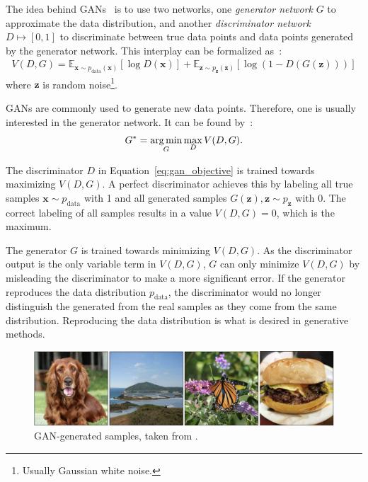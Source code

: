 The idea behind \acp{GAN}~\citep{goodfellow2014gans} is to use two networks, one \textit{generator network} $G$ to approximate the data distribution, and another \textit{discriminator network} $D \mapsto [0, 1]$ to discriminate between true data points and data points generated by the generator network.
This interplay can be formalized as~\citep{goodfellow2014gans}:
\begin{align}
    V(D, G)=\mathbb{E}_{\bm{x} \sim p_{\text{data}}(\bm{x})}[\log D(\bm{x})]+\mathbb{E}_{\bm{z} \sim p_{\bm{z}}(\bm{z})}[\log (1-D(G(\bm{z})))]
\end{align}
where $\bm{z}$ is random noise\footnote{Usually Gaussian white noise.}.

\acp{GAN} are commonly used to generate new data points.
Therefore, one is usually interested in the generator network.
It can be found by~\citep{goodfellow2014gans}:
\begin{align}
    G^* = \operatorname*{arg\,min}_G \max_{D} V(D, G). \label{eq:gan_objective}
\end{align}

The discriminator $D$ in Equation~\ref{eq:gan_objective} is trained towards maximizing $V(D, G)$.
A perfect discriminator achieves this by labeling all true samples $\bm{x} \sim p_{\text{data}}$ with 1 and all generated samples $G(\bm{z}), \bm{z}\sim p_{\bm{z}}$ with 0.
The correct labeling of all samples results in a value $V(D, G) = 0$, which is the maximum.

The generator $G$ is trained towards minimizing $V(D, G)$.
As the discriminator output is the only variable term in $V(D, G)$, $G$ can only minimize $V(D, G)$ by misleading the discriminator to make a more significant error.
If the generator reproduces the data distribution $p_{\text{data}}$, the discriminator would no longer distinguish the generated from the real samples as they come from the same distribution.
Reproducing the data distribution is what is desired in generative methods.

\begin{figure}
    \centering
    \includegraphics[width=\textwidth]{images/gan_samples.png}
    \caption[GAN-generated samples]{GAN-generated samples, taken from \citet{brock2018large}.}
    \label{fig:gan_samples}
\end{figure}

